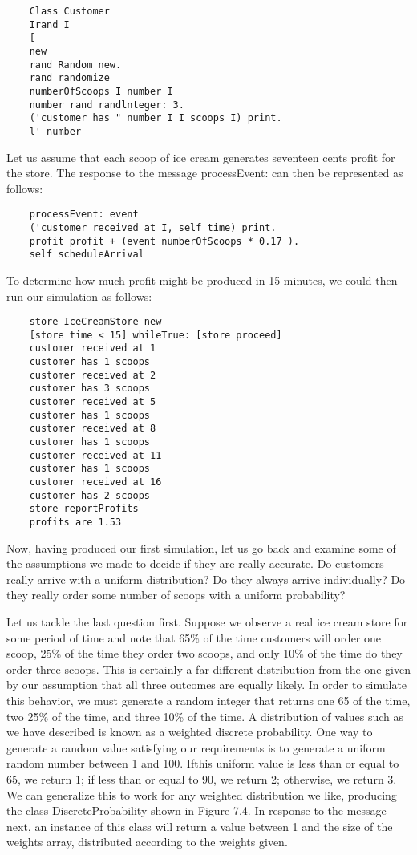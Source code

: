 \begin{lstlisting}
    Class Customer
    Irand I
    [
    new
    rand Random new.
    rand randomize
    numberOfScoops I number I
    number rand randlnteger: 3.
    ('customer has " number I I scoops I) print.
    l' number    
\end{lstlisting}

Let us assume that each scoop of ice cream generates seventeen cents profit for
the store. The response to the message processEvent: can then be represented as
follows:
\begin{lstlisting}
    processEvent: event
    ('customer received at I, self time) print.
    profit profit + (event numberOfScoops * 0.17 ).
    self scheduleArrival    
\end{lstlisting}
To determine how much profit might be produced in 15 minutes, we could then run
our simulation as follows:
\begin{lstlisting}
    store IceCreamStore new
    [store time < 15] whileTrue: [store proceed]
    customer received at 1
    customer has 1 scoops
    customer received at 2
    customer has 3 scoops
    customer received at 5
    customer has 1 scoops
    customer received at 8
    customer has 1 scoops
    customer received at 11
    customer has 1 scoops
    customer received at 16
    customer has 2 scoops
    store reportProfits
    profits are 1.53    
\end{lstlisting}

Now, having produced our first simulation, let us go back and examine some of
the assumptions we made to decide if they are really accurate. Do customers
really arrive with a uniform distribution? Do they always arrive individually?
Do they really order some number of scoops with a uniform probability?

Let us tackle the last question first. Suppose we observe a real ice cream store
for some period of time and note that 65\% of the time customers will order one
scoop, 25\% of the time they order two scoops, and only 10\% of the time do they
order three scoops. This is certainly a far different distribution from the one
given by our assumption that all three outcomes are equally likely. In order to
simulate this behavior, we must generate a random integer that returns one 65%
of the time, two 25\% of the time, and three 10\% of the time. A distribution of
values such as we have described is known as a weighted discrete probability.
One way to generate a random value satisfying our requirements is to generate a
uniform random number between 1 and 100. Ifthis uniform value is less than or
equal to 65, we return 1; if less than or equal to 90, we return 2; otherwise,
we return 3. We can generalize this to work for any weighted distribution we
like, producing the class DiscreteProbability shown in Figure 7.4. In response
to the message next, an instance of this class will return a value between 1 and
the size of the weights array, distributed according to the weights given.

